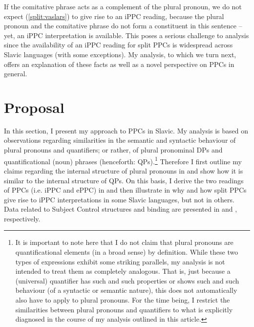 \documentclass[output=paper,colorlinks,citecolor=brown]{langscibook}
\begin{document}
\noindent If the comitative phrase acts as a complement of the plural pronoun, we do not expect (\ref{split:vaslars}) to give rise to an iPPC reading, because the plural pronoun and the comitative phrase do not form a constituent in this sentence -- yet, an iPPC interpretation is available. This poses a serious challenge to  analysis since the availability of an iPPC reading for split PPCs is %
widespread across Slavic languages (with some exceptions). My analysis, to which we turn next, offers an explanation of these facts as well as a novel perspective on PPCs in general. 




\section{Proposal}\label{sec:proposal}
In this section, I present my approach to PPCs in Slavic. My analysis is based on observations regarding similarities in the semantic and syntactic behaviour of plural pronouns and quantifiers; or rather, of plural pronominal DPs and quantificational (noun) phrases (henceforth: QPs).\footnote{It is important to note here that I do not claim that plural pronouns are quantificational elements (in a broad sense) by definition. While these two types of expressions exhibit some striking parallels, my analysis is not intended to treat them as completely analogous. That is, just because a (universal) quantifier has such and such properties or shows such and such behaviour (of a syntactic or semantic nature), this does not automatically also have to apply to plural pronouns. For the time being, I restrict the similarities between plural pronouns and quantifiers to what is explicitly diagnosed in the course of my analysis outlined in this article.} Therefore I first outline my claims regarding the internal structure of plural pronouns in  and show how it is similar to the internal structure of QPs. On this basis, I derive the two readings of PPCs (i.e. iPPC and ePPC) in  and then illustrate in  why and how split PPCs give rise to iPPC interpretations in some Slavic languages, but not in others. Data related to Subject Control structures and binding are presented in %
 and , respectively. 
\end{document}

